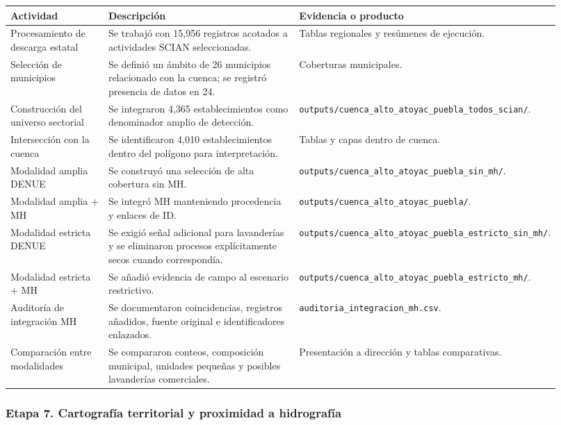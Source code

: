 \documentclass[
  spanish,
]{article}
\newcounter{none} %
\begin{document}
{\def\LTcaptype{none} %
\begin{longtable}[]{@{}p{0.20\linewidth}p{0.44\linewidth}p{0.28\linewidth}@{}}
\toprule\noalign{}
Actividad & Descripción & Evidencia o producto \\
\midrule\noalign{}
\endhead
\bottomrule\noalign{}
\endlastfoot
Procesamiento de descarga estatal & Se trabajó con 15,956 registros
acotados a actividades SCIAN seleccionadas. & Tablas regionales y
resúmenes de ejecución. \\
Selección de municipios & Se definió un ámbito de 26 municipios
relacionado con la cuenca; se registró presencia de datos en 24. &
Coberturas municipales. \\
Construcción del universo sectorial & Se integraron 4,365
establecimientos como denominador amplio de detección. &
\texttt{outputs/cuenca\_alto\_atoyac\_puebla\_todos\_scian/}. \\
Intersección con la cuenca & Se identificaron 4,010 establecimientos
dentro del polígono para interpretación. & Tablas y capas dentro de
cuenca. \\
Modalidad amplia DENUE & Se construyó una selección de alta cobertura
sin MH. & \texttt{outputs/cuenca\_alto\_atoyac\_puebla\_sin\_mh/}. \\
Modalidad amplia + MH & Se integró MH manteniendo procedencia y enlaces
de ID. & \texttt{outputs/cuenca\_alto\_atoyac\_puebla/}. \\
Modalidad estricta DENUE & Se exigió señal adicional para lavanderías y
se eliminaron procesos explícitamente secos cuando correspondía. &
\texttt{outputs/cuenca\_alto\_atoyac\_puebla\_estricto\_sin\_mh/}. \\
Modalidad estricta + MH & Se añadió evidencia de campo al escenario
restrictivo. &
\texttt{outputs/cuenca\_alto\_atoyac\_puebla\_estricto\_mh/}. \\
Auditoría de integración MH & Se documentaron coincidencias, registros
añadidos, fuente original e identificadores enlazados. &
\texttt{auditoria\_integracion\_mh.csv}. \\
Comparación entre modalidades & Se compararon conteos, composición
municipal, unidades pequeñas y posibles lavanderías comerciales. &
Presentación a dirección y tablas comparativas. \\
\end{longtable}
}

\subsubsection{Etapa 7. Cartografía territorial y proximidad a
hidrografía}\label{etapa-7-cartografuxeda-territorial-y-proximidad-a-hidrografuxeda}
\end{document}
